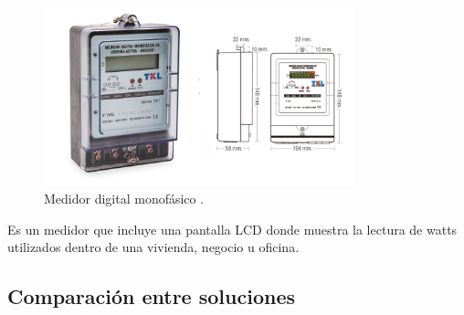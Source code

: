 \begin{itemize}
\begin{figure}[htbp]
	\centering
	\includegraphics[width=0.8\textwidth]{./Figures/medidor.png}
	\caption{Medidor digital monofásico \protect\footnotemark.}
	\label{fig:medidor}
\end{figure}


Es un medidor que incluye una pantalla LCD donde muestra la lectura de watts utilizados dentro de una vivienda, negocio u oficina.

\end{itemize}

\subsection{Comparación entre soluciones}

